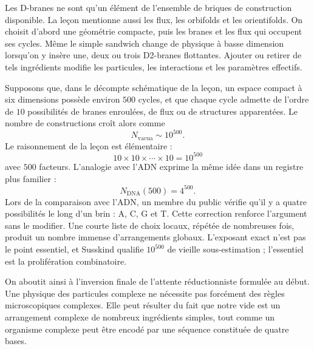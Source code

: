 Les D-branes ne sont qu’un élément de l’ensemble de briques de construction disponible. La leçon mentionne aussi les flux, les orbifolds et les orientifolds. On choisit d’abord une géométrie compacte, puis les branes et les flux qui occupent ses cycles. Même le simple sandwich change de physique à basse dimension lorsqu’on y insère une, deux ou trois D2-branes flottantes. Ajouter ou retirer de tels ingrédients modifie les particules, les interactions et les paramètres effectifs.

Supposons que, dans le décompte schématique de la leçon, un espace compact à six dimensions possède environ \(500\) cycles, et que chaque cycle admette de l’ordre de \(10\) possibilités de branes enroulées, de flux ou de structures apparentées. Le nombre de constructions croît alors comme
\begin{equation}
N_{\mathrm{vacua}} \sim 10^{500}.
\end{equation}
Le raisonnement de la leçon est élémentaire :
\begin{equation}
10 \times 10 \times \cdots \times 10 = 10^{500}
\end{equation}
avec \(500\) facteurs. L’analogie avec l’ADN exprime la même idée dans un registre plus familier :
\begin{equation}
N_{\mathrm{DNA}}(500)=4^{500}.
\end{equation}
Lors de la comparaison avec l’ADN, un membre du public vérifie qu’il y a quatre possibilités le long d’un brin : A, C, G et T. Cette correction renforce l’argument sans le modifier. Une courte liste de choix locaux, répétée de nombreuses fois, produit un nombre immense d’arrangements globaux. L’exposant exact n’est pas le point essentiel, et Susskind qualifie \(10^{500}\) de vieille sous-estimation ; l’essentiel est la prolifération combinatoire.

On aboutit ainsi à l’inversion finale de l’attente réductionniste formulée au début. Une physique des particules complexe ne nécessite pas forcément des règles microscopiques complexes. Elle peut résulter du fait que notre vide est un arrangement complexe de nombreux ingrédients simples, tout comme un organisme complexe peut être encodé par une séquence constituée de quatre bases.

\begin{classroomqa}
\end{classroomqa}

